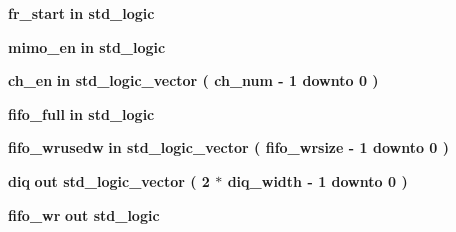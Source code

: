 \begin{DoxyCompactItemize}
{\bf fr\+\_\+start}  {\bfseries {\bfseries \textcolor{keywordflow}{in}\textcolor{vhdlchar}{ }}} {\bfseries \textcolor{comment}{std\+\_\+logic}\textcolor{vhdlchar}{ }} 
\item 
{\bf mimo\+\_\+en}  {\bfseries {\bfseries \textcolor{keywordflow}{in}\textcolor{vhdlchar}{ }}} {\bfseries \textcolor{comment}{std\+\_\+logic}\textcolor{vhdlchar}{ }} 
\item 
{\bf ch\+\_\+en}  {\bfseries {\bfseries \textcolor{keywordflow}{in}\textcolor{vhdlchar}{ }}} {\bfseries \textcolor{comment}{std\+\_\+logic\+\_\+vector}\textcolor{vhdlchar}{ }\textcolor{vhdlchar}{(}\textcolor{vhdlchar}{ }\textcolor{vhdlchar}{ }\textcolor{vhdlchar}{ }\textcolor{vhdlchar}{ }{\bfseries {\bf ch\+\_\+num}} \textcolor{vhdlchar}{-\/}\textcolor{vhdlchar}{ } \textcolor{vhdldigit}{1} \textcolor{vhdlchar}{ }\textcolor{keywordflow}{downto}\textcolor{vhdlchar}{ }\textcolor{vhdlchar}{ } \textcolor{vhdldigit}{0} \textcolor{vhdlchar}{ }\textcolor{vhdlchar}{)}\textcolor{vhdlchar}{ }} 
\item 
{\bf fifo\+\_\+full}  {\bfseries {\bfseries \textcolor{keywordflow}{in}\textcolor{vhdlchar}{ }}} {\bfseries \textcolor{comment}{std\+\_\+logic}\textcolor{vhdlchar}{ }} 
\item 
{\bf fifo\+\_\+wrusedw}  {\bfseries {\bfseries \textcolor{keywordflow}{in}\textcolor{vhdlchar}{ }}} {\bfseries \textcolor{comment}{std\+\_\+logic\+\_\+vector}\textcolor{vhdlchar}{ }\textcolor{vhdlchar}{(}\textcolor{vhdlchar}{ }\textcolor{vhdlchar}{ }\textcolor{vhdlchar}{ }\textcolor{vhdlchar}{ }{\bfseries {\bf fifo\+\_\+wrsize}} \textcolor{vhdlchar}{-\/}\textcolor{vhdlchar}{ } \textcolor{vhdldigit}{1} \textcolor{vhdlchar}{ }\textcolor{keywordflow}{downto}\textcolor{vhdlchar}{ }\textcolor{vhdlchar}{ } \textcolor{vhdldigit}{0} \textcolor{vhdlchar}{ }\textcolor{vhdlchar}{)}\textcolor{vhdlchar}{ }} 
\item 
{\bf diq}  {\bfseries {\bfseries \textcolor{keywordflow}{out}\textcolor{vhdlchar}{ }}} {\bfseries \textcolor{comment}{std\+\_\+logic\+\_\+vector}\textcolor{vhdlchar}{ }\textcolor{vhdlchar}{(}\textcolor{vhdlchar}{ }\textcolor{vhdlchar}{ } \textcolor{vhdldigit}{2} \textcolor{vhdlchar}{$\ast$}\textcolor{vhdlchar}{ }\textcolor{vhdlchar}{ }\textcolor{vhdlchar}{ }{\bfseries {\bf diq\+\_\+width}} \textcolor{vhdlchar}{-\/}\textcolor{vhdlchar}{ } \textcolor{vhdldigit}{1} \textcolor{vhdlchar}{ }\textcolor{keywordflow}{downto}\textcolor{vhdlchar}{ }\textcolor{vhdlchar}{ } \textcolor{vhdldigit}{0} \textcolor{vhdlchar}{ }\textcolor{vhdlchar}{)}\textcolor{vhdlchar}{ }} 
\item 
{\bf fifo\+\_\+wr}  {\bfseries {\bfseries \textcolor{keywordflow}{out}\textcolor{vhdlchar}{ }}} {\bfseries \textcolor{comment}{std\+\_\+logic}\textcolor{vhdlchar}{ }} 
\end{DoxyCompactItemize}


